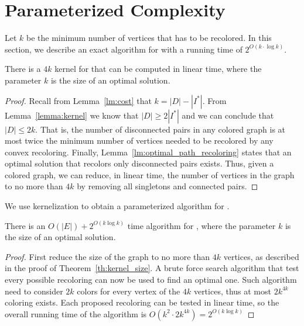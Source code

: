 \section{Parameterized Complexity}
\label{sec:fpt}

Let $k$ be the minimum number of vertices that has to be recolored. In this
section, we describe an exact algorithm for \TWOCR{} with a running time
of $2^{O(k\cdot \log{k})}$.

\begin{theorem}
\label{th:kernel_size}
There is a $4k$ kernel for \TWOCR{} that can be computed in linear time, where the
parameter $k$ is the size of an optimal solution.
\end{theorem}

\begin{proof}
	Recall from Lemma~\ref{lm:cost} that $k = |D| - |I^*|$.
	From Lemma~\ref{lemma:kernel} we know that $|D| \geq 2|I^*|$ and we can
	conclude that $|D| \leq 2k$.
	That is, the number of disconnected pairs in any colored graph is at most twice
	the minimum number of vertices needed to be recolored by any convex recoloring.
	Finally, Lemma~\ref{lm:optimal_path_recoloring} states that an optimal solution
	that recolors only disconnected pairs exists.
	Thus, given a colored graph, we can reduce, in linear time, the number of
	vertices in the graph to no more than $4k$ by removing all singletons and connected
	pairs.
\end{proof}

We use kernelization to obtain a parameterized algorithm for \TWOCR{}.

\begin{theorem}
There is an $O(|E|) + 2^{O(k\log{k})}$ time algorithm for \TWOCR{}, where
the parameter $k$ is the size of an optimal solution.
\end{theorem}

\begin{proof}
	First reduce the size of the graph to no more than $4k$ vertices, as described
	in the proof of Theorem~\ref{th:kernel_size}.
	A brute force search algorithm
	that test every possible recoloring can now be used to find an optimal one.
	Such algorithm need to consider $2k$ colors for every vertex of the $4k$
	vertices, thus at most $2k^{4k}$ coloring exists. 
	Each proposed recoloring can be tested in linear time, so the overall running
	time of the algorithm is $O(k^2 \cdot 2k^{4k}) =  2^{O(k\log{k})}$
\end{proof}

